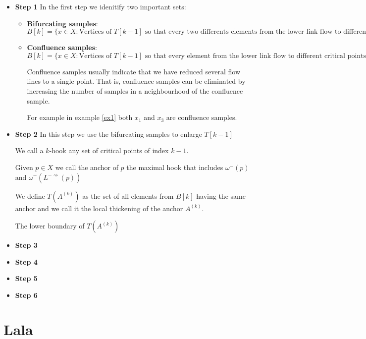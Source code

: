 \begin{itemize}

    \item {\bf Step 1}
        In the first step we idenitify two important sets:
        
        \begin{itemize}
            \item {\bf Bifurcating samples}: 
                $
                B[k]
                =\{
                    x\in X: \text{
                        Vertices of } T[k-1] \text{ so that every two differents elements
                        from the lower link flow to different critical points
                    }
                \}
                $
            \item {\bf Confluence samples}: 
                $
                B[k]
                =\{
                    x\in X: \text{
                        Vertices of } T[k-1] \text{ so that every element
                        from the lower link flow to different critical points
                    }
                \}
                $

                Confluence samples usually indicate that we have reduced several flow lines
                to a single point. That is, confluence samples can be eliminated by increasing the number of samples in a neighbourhood of the confluence
                sample.

                For example in example \ref{ex1} both $x_1$ and $x_3$ are confluence samples.
        \end{itemize}


    \item {\bf Step 2}
        In this step we use the bifurcating samples to enlarge $T[k-1]$

        \begin{definition}
            We call a $k$-hook any set of critical points of index $k-1$.

            Given $p\in X$ we call the anchor of $p$ the maximal hook that includes
            $\omega^-(p)$
            and
            $\omega^-(
                L^{-\rightsquigarrow}(p)
            )$
        \end{definition}


        \begin{definition}
            We define $T(A^{(k)})$ as the set of all elements from $B[k]$ having the same anchor
            and we call it the local thickening of the anchor $A^{(k)}$.       


            The lower boundary of $T(A^{(k)})$
        \end{definition}

    \item {\bf Step 3}
        
    \item {\bf Step 4}

    \item {\bf Step 5}

    \item {\bf Step 6}

\end{itemize}


\section{Lala}
